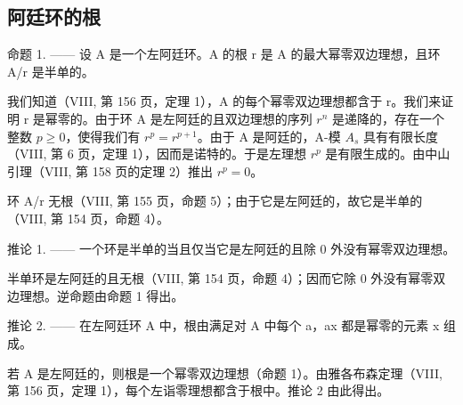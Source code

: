 \subsection{阿廷环的根}

命题 1. —— 设 A 是一个左阿廷环。A 的根 r 是 A 的最大幂零双边理想，且环 A/r 是半单的。

我们知道（VIII, 第 156 页，定理 1），A 的每个幂零双边理想都含于 r。我们来证明 r 是幂零的。由于环 A 是左阿廷的且双边理想的序列 \(r^{n}\) 是递降的，存在一个整数 \(p \geqslant 0\)，使得我们有 \(r^{p} = r^{p+1}\)。由于 A 是阿廷的，A-模 \(A_{s}\) 具有有限长度（VIII, 第 6 页，定理 1），因而是诺特的。于是左理想 \(r^{p}\) 是有限生成的。由中山引理（VIII, 第 158 页的定理 2）推出 \(r^{p} = 0\)。

环 A/r 无根（VIII, 第 155 页，命题 5）；由于它是左阿廷的，故它是半单的（VIII, 第 154 页，命题 4）。

推论 1. —— 一个环是半单的当且仅当它是左阿廷的且除 0 外没有幂零双边理想。

半单环是左阿廷的且无根（VIII, 第 154 页，命题 4）；因而它除 0 外没有幂零双边理想。逆命题由命题 1 得出。

推论 2. —— 在左阿廷环 A 中，根由满足对 A 中每个 a，ax 都是幂零的元素 x 组成。

若 A 是左阿廷的，则根是一个幂零双边理想（命题 1）。由雅各布森定理（VIII, 第 156 页，定理 1），每个左诣零理想都含于根中。推论 2 由此得出。

